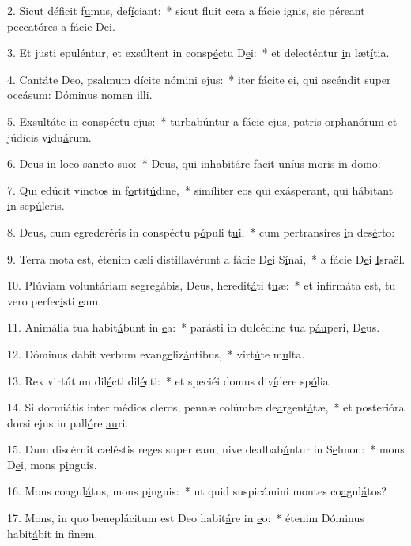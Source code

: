 2. Sicut déficit f\uline{u}mus, def\uline{í}ciant:~* sicut fluit cera a fácie ignis, sic péreant peccatóres a f\uline{á}cie D\uline{e}i.\par 
3. Et justi epuléntur, et exsúltent in consp\uline{é}ctu D\uline{e}i:~* et delecténtur \uline{i}n læt\uline{í}tia.\par 
4. Cantáte Deo, psalmum dícite n\uline{ó}mini \uline{e}jus:~* iter fácite ei, qui ascéndit super occásum: Dóminus n\uline{o}men \uline{i}lli.\par 
5. Exsultáte in consp\uline{é}ctu \uline{e}jus:~* turbabúntur a fácie ejus, patris orphanórum et júdicis v\uline{i}du\uline{á}rum.\par 
6. Deus in loco s\uline{a}ncto s\uline{u}o:~* Deus, qui inhabitáre facit uníus m\uline{o}ris in d\uline{o}mo:\par 
7. Qui edúcit vinctos in f\uline{o}rtit\uline{ú}dine,~* simíliter eos qui exásperant, qui hábitant \uline{i}n sep\uline{ú}lcris.\par 
8. Deus, cum egrederéris in conspéctu p\uline{ó}puli t\uline{u}i,~* cum pertransíres \uline{i}n des\uline{é}rto:\par 
9. Terra mota est, étenim cæli distillavérunt a fácie D\uline{e}i S\uline{í}nai,~* a fácie D\uline{e}i \uline{I}sraël.\par 
10. Plúviam voluntáriam segregábis, Deus, heredit\uline{á}ti t\uline{u}æ:~* et infirmáta est, tu vero perfec\uline{í}sti \uline{e}am.\par 
11. Animália tua habit\uline{á}bunt in \uline{e}a:~* parásti in dulcédine tua p\uline{áu}peri, D\uline{e}us.\par 
12. Dóminus dabit verbum evang\uline{e}liz\uline{á}ntibus,~* virt\uline{ú}te m\uline{u}lta.\par 
13. Rex virtútum dil\uline{é}cti dil\uline{é}cti:~* et speciéi domus div\uline{í}dere sp\uline{ó}lia.\par 
14. Si dormiátis inter médios cleros, pennæ colúmbæ de\uline{a}rgent\uline{á}tæ,~* et posterióra dorsi ejus in pall\uline{ó}re \uline{au}ri.\par 
15. Dum discérnit cæléstis reges super eam, nive dealbab\uline{ú}ntur in S\uline{e}lmon:~* mons D\uline{e}i, mons p\uline{i}nguis.\par 
16. Mons coagul\uline{á}tus, mons p\uline{i}nguis:~* ut quid suspicámini montes co\uline{a}gul\uline{á}tos?\par 
17. Mons, in quo beneplácitum est Deo habit\uline{á}re in \uline{e}o:~* étenim Dóminus habit\uline{á}bit in f\uline{i}nem.\par 
